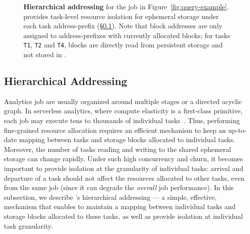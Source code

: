 \begin{figure}[t]
\begin{tikzpicture}[font=\scriptsize, yscale=0.75, task/.style={draw, circle, align=center, inner sep=2pt}, block/.style={draw, align=center, fill=gray!20, inner sep=2pt}]
  \end{tikzpicture}
  \vspace{-1em}
  \caption{\textbf{Hierarchical addressing} for the job in Figure~\ref{fig:query-example}. \jiffy provides task-level resource isolation for ephemeral storage under each task address-prefix (\S\ref{ssec:hva}). Note that block addresses are only assigned to address-prefixes with currently allocated blocks; for tasks \texttt{T1}, \texttt{T2} and \texttt{T4}, blocks are directly read from persistent storage and not stored in \jiffy.}
  \label{fig:hina}\vspace{-1em}
\end{figure}

\subsection{Hierarchical Addressing}
\label{ssec:hva}
Analytics job are usually organized around multiple stages or a directed acyclic graph. In serverless analytics, where compute elasticity is a first-class primitive, each job may execute tens to thousands of individual tasks~\cite{starling, locus, pocket, flint, sparkonlambda, cirrus, excamera, pywren, numpywren, gg, athena, aurora, azuresqldw, cloudburst, snowset}. Thus, performing fine-grained resource allocation requires an efficient mechanism to keep an up-to-date mapping between tasks and storage blocks allocated to individual tasks. Moreover, the number of tasks reading and writing to the shared ephemeral storage can change rapidly. Under such high concurrency and churn, it becomes important to provide isolation at the granularity of individual tasks: arrival and departure of a task should not affect the resources allocated to other tasks, even from the same job (since it can degrade the \textit{overall} job performance). In this subsection, we describe \jiffy's hierarchical addressing --- a simple, effective, mechanism that enables \jiffy to maintain a mapping between individual tasks and storage blocks allocated to these tasks, as well as provide isolation at individual task granularity.


